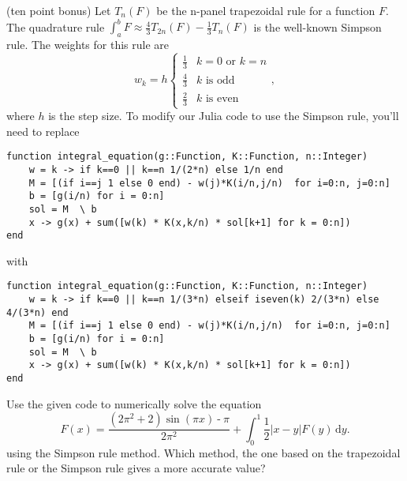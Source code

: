\documentclass[12pt,fleqn]{exam}
\begin{document}
\begin{questions}
 
 \question (ten point bonus)   Let $T_n(F)$ be the n-panel trapezoidal rule for a function $F$.  The quadrature rule $\int_a^b F \approx
 \frac{4}{3} T_{2n}(F) - \frac{1}{3} T_n(F)$ is the well-known Simpson rule.  The weights for this rule are
 \begin{equation}
    w_k = h \begin{cases}   \frac{1}{3} & k = 0 \text{ or } k = n \\
                                              \frac{4}{3} & k \text{ is odd } \\
                                                      \frac{2}{3} & k \text{ is even }
\end{cases}, 
 \end{equation}
 where $h$ is the step size.  To modify our Julia code to use the Simpson rule, you'll need to replace
 \begin{verbatim}
function integral_equation(g::Function, K::Function, n::Integer)
    w = k -> if k==0 || k==n 1/(2*n) else 1/n end
    M = [(if i==j 1 else 0 end) - w(j)*K(i/n,j/n)  for i=0:n, j=0:n]
    b = [g(i/n) for i = 0:n]
    sol = M  \ b
    x -> g(x) + sum([w(k) * K(x,k/n) * sol[k+1] for k = 0:n])
end
\end{verbatim}
with 
\begin{verbatim}
function integral_equation(g::Function, K::Function, n::Integer)
    w = k -> if k==0 || k==n 1/(3*n) elseif iseven(k) 2/(3*n) else 4/(3*n) end
    M = [(if i==j 1 else 0 end) - w(j)*K(i/n,j/n)  for i=0:n, j=0:n]
    b = [g(i/n) for i = 0:n]
    sol = M  \ b
    x -> g(x) + sum([w(k) * K(x,k/n) * sol[k+1] for k = 0:n])
end
\end{verbatim}

Use the given code to numerically solve the equation
\begin{equation}
F(x) =  \frac{\left( 2 {{\ensuremath{\pi} }^{2}}\operatorname{+}2\right)  \sin{\left( \ensuremath{\pi}  x\right) }\operatorname{-}\ensuremath{\pi} }{2 {{\ensuremath{\pi} }^{2}}}  + \int_0^1 \frac{1}{2} |x - y| F(y) \, \mathrm{d} y.
\end{equation}
using the Simpson rule method.  Which method, the one based on the trapezoidal rule or the Simpson rule gives a more accurate value? 
 
 

\end{questions}
\end{document}
